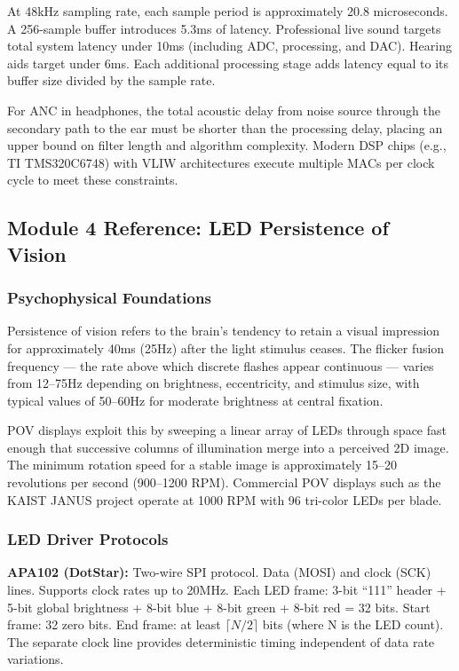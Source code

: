 \documentclass[11pt,letterpaper]{article}
\begin{document}
At 48kHz sampling rate, each sample period is approximately 20.8 microseconds. A 256-sample buffer introduces 5.3ms of latency. Professional live sound targets total system latency under 10ms (including ADC, processing, and DAC). Hearing aids target under 6ms. Each additional processing stage adds latency equal to its buffer size divided by the sample rate.

For ANC in headphones, the total acoustic delay from noise source through the secondary path to the ear must be shorter than the processing delay, placing an upper bound on filter length and algorithm complexity. Modern DSP chips (e.g., TI TMS320C6748) with VLIW architectures execute multiple MACs per clock cycle to meet these constraints.

\subsection{Module 4 Reference: LED Persistence of Vision}

\subsubsection{Psychophysical Foundations}

Persistence of vision refers to the brain's tendency to retain a visual impression for approximately 40ms (25Hz) after the light stimulus ceases. The flicker fusion frequency --- the rate above which discrete flashes appear continuous --- varies from 12--75Hz depending on brightness, eccentricity, and stimulus size, with typical values of 50--60Hz for moderate brightness at central fixation.

POV displays exploit this by sweeping a linear array of LEDs through space fast enough that successive columns of illumination merge into a perceived 2D image. The minimum rotation speed for a stable image is approximately 15--20 revolutions per second (900--1200 RPM). Commercial POV displays such as the KAIST JANUS project operate at 1000 RPM with 96 tri-color LEDs per blade.

\subsubsection{LED Driver Protocols}

\textbf{APA102 (DotStar):} Two-wire SPI protocol. Data (MOSI) and clock (SCK) lines. Supports clock rates up to 20MHz. Each LED frame: 3-bit ``111'' header + 5-bit global brightness + 8-bit blue + 8-bit green + 8-bit red = 32 bits. Start frame: 32 zero bits. End frame: at least $\lceil N/2 \rceil$ bits (where N is the LED count). The separate clock line provides deterministic timing independent of data rate variations.
\end{document}
